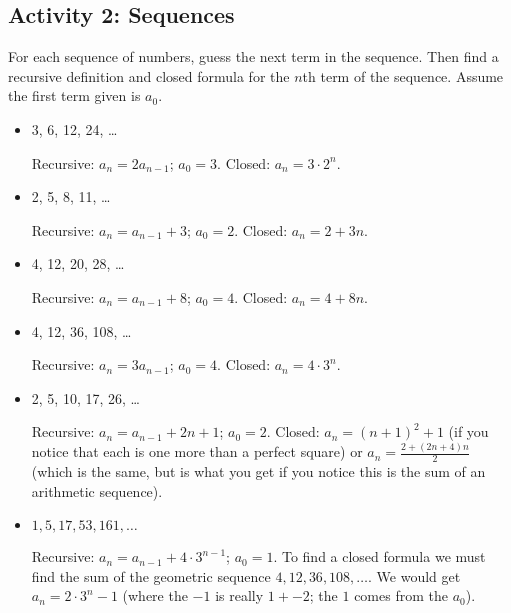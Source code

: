 \documentclass[11pt]{exam}
\begin{document}
\newpage

\subsection*{Activity 2: Sequences}

For each sequence of numbers, guess the next term in  the sequence.  Then find a recursive definition and closed formula for the $n$th term of the sequence.  Assume the first term given is $a_0$.

\begin{itemize}
\item 3, 6, 12, 24, \ldots
\begin{solution}
Recursive: $a_n = 2a_{n-1}$; $a_0 = 3$.  Closed: $a_n = 3 \cdot 2^n$.
\end{solution}
\vfill
\item 2, 5, 8, 11, \ldots
\begin{solution}
Recursive: $a_n = a_{n-1} + 3$; $a_0 = 2$.  Closed: $a_n = 2 + 3n$.
\end{solution}
\vfill
\item 4, 12, 20, 28, \ldots
\begin{solution}
Recursive: $a_n = a_{n-1} + 8$; $a_0 = 4$.  Closed: $a_n = 4 + 8n$.
\end{solution}
\vfill
\item 4, 12, 36, 108, \ldots
\begin{solution}
Recursive: $a_n = 3a_{n-1}$; $a_0 = 4$.  Closed: $a_n = 4\cdot 3^n$.
\end{solution}
\vfill
\item 2, 5, 10, 17, 26, \ldots
\begin{solution}
Recursive: $a_n = a_{n-1} + 2n+1$; $a_0 = 2$.  Closed: $a_n = (n+1)^2 + 1$ (if you notice that each is one more than a perfect square) or $a_n = \frac{2+(2n+4)n}{2}$ (which is the same, but is what you get if you notice this is the sum of an arithmetic sequence).
\end{solution}
\vfill
\item $1, 5, 17, 53, 161,\ldots$
\begin{solution}
  Recursive: $a_n = a_{n-1} + 4\cdot 3^{n-1}$; $a_0 = 1$.  To find a closed formula we must find the sum of the geometric sequence $4, 12, 36, 108,\ldots$.  We would get $a_n =2\cdot 3^n - 1$ (where the $-1$ is really $1 + -2$; the $1$ comes from the $a_0$).
\end{solution}
\end{itemize}
\end{document}
